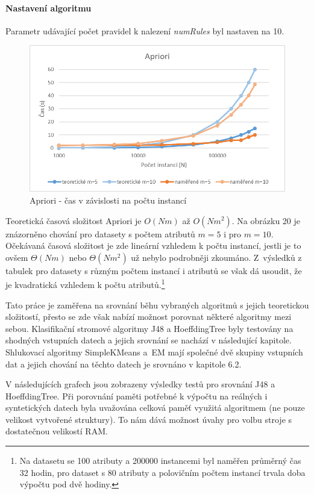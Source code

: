 \documentclass[12pt]{article}
\begin{document}
\paragraph{Nastavení algoritmu}
Parametr udávající počet pravidel k nalezení \textit{numRules} byl nastaven na 10.
\begin{figure}[hbp]
  \centering
  \includegraphics[scale=1]{img/apriori.png}
  \caption{Apriori - čas v závislosti na počtu instancí}
\end{figure}
Teoretická časová složitost Apriori je $O(Nm)$ až $O(Nm^2)$. Na obrázku 20 je znázorněno chování pro datasety s počtem atributů $m=5$ i pro $m=10$. Očekávaná časová složitost je zde lineární vzhledem k počtu instancí, jestli je to ovšem $\Theta(Nm)$ nebo $\Theta(Nm^2)$ už nebylo podrobněji zkoumáno. Z~výsledků z tabulek pro datasety s různým počtem instancí i atributů se však dá usoudit, že je kvadratická vzhledem k počtu atributů.\footnote{Na datasetu se 100 atributy a 200000 instancemi byl naměřen průměrný čas 32 hodin, pro dataset s 80 atributy a polovičním počtem instancí trvala doba výpočtu pod dvě hodiny.} 

Tato práce je zaměřena na srovnání běhu vybraných algoritmů s jejich teoretickou složitostí, přesto se zde však nabízí možnost porovnat některé algoritmy mezi sebou. Klasifikační stromové algoritmy J48 a HoeffdingTree byly testovány na shodných vstupních datech a jejich srovnání se nachází v následující kapitole. Shlukovací algoritmy SimpleKMeans a~EM mají společné dvě skupiny vstupních dat a jejich chování na těchto datech je srovnáno v kapitole 6.2.

\newpage
{}
V následujících grafech jsou zobrazeny výsledky testů pro srovnání J48 a HoeffdingTree. Při porovnání paměti potřebné k výpočtu na reálných i syntetických datech byla uvažována celková paměť využitá algoritmem (ne pouze velikost vytvořené struktury). To nám dává možnost úvahy pro volbu stroje s dostatečnou velikostí RAM.
\end{document}

